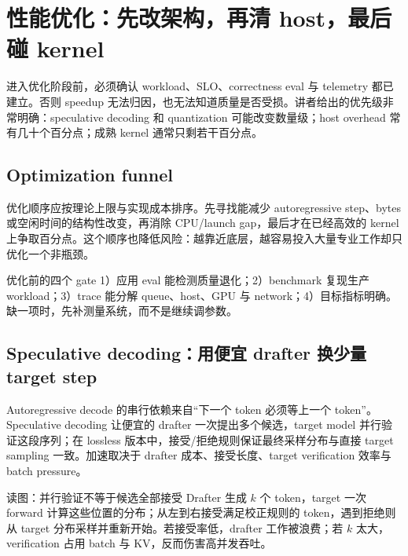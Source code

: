 \section{性能优化：先改架构，再清 host，最后碰 kernel}

进入优化阶段前，必须确认 workload、SLO、correctness eval 与 telemetry 都已建立。否则 speedup 无法归因，也无法知道质量是否受损。讲者给出的优先级非常明确：speculative decoding 和 quantization 可能改变数量级；host overhead 常有几十个百分点；成熟 kernel 通常只剩若干百分点。

\subsection{Optimization funnel}

优化顺序应按理论上限与实现成本排序。先寻找能减少 autoregressive step、bytes 或空闲时间的结构性改变，再消除 CPU/launch gap，最后才在已经高效的 kernel 上争取百分点。这个顺序也降低风险：越靠近底层，越容易投入大量专业工作却只优化一个非瓶颈。


\begin{importantbox}{优化前的四个 gate}
1）应用 eval 能检测质量退化；2）benchmark 复现生产 workload；3）trace 能分解 queue、host、GPU 与 network；4）目标指标明确。缺一项时，先补测量系统，而不是继续调参数。
\end{importantbox}

\subsection{Speculative decoding：用便宜 drafter 换少量 target step}

Autoregressive decode 的串行依赖来自“下一个 token 必须等上一个 token”。Speculative decoding 让便宜的 drafter 一次提出多个候选，target model 并行验证这段序列；在 lossless 版本中，接受/拒绝规则保证最终采样分布与直接 target sampling 一致。加速取决于 drafter 成本、接受长度、target verification 效率与 batch pressure。


\begin{knowledgebox}{读图：并行验证不等于候选全部接受}
Drafter 生成 $k$ 个 token，target 一次 forward 计算这些位置的分布；从左到右接受满足校正规则的 token，遇到拒绝则从 target 分布采样并重新开始。若接受率低，drafter 工作被浪费；若 $k$ 太大，verification 占用 batch 与 KV，反而伤害高并发吞吐。
\end{knowledgebox}

